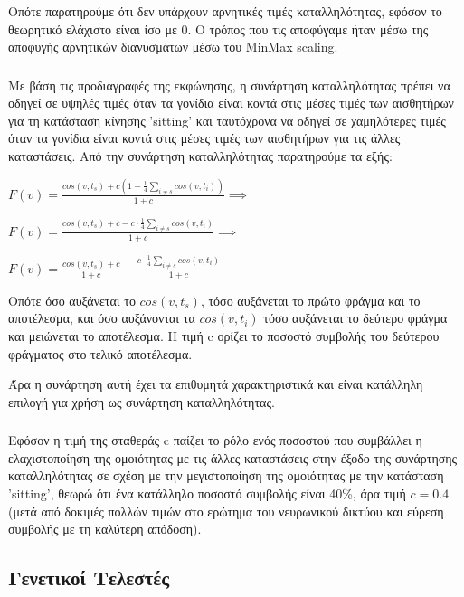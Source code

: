 \documentclass[12pt,a4paper]{article}
\begin{document}
Οπότε παρατηρούμε ότι δεν υπάρχουν αρνητικές τιμές καταλληλότητας, εφόσον το θεωρητικό ελάχιστο είναι ίσο με 0. Ο τρόπος που τις αποφύγαμε ήταν μέσω της αποφυγής αρνητικών διανυσμάτων μέσω του MinMax scaling.

\subsubsection{}

Με βάση τις προδιαγραφές της εκφώνησης, η συνάρτηση καταλληλότητας πρέπει να οδηγεί σε υψηλές τιμές όταν τα γονίδια είναι κοντά στις μέσες τιμές των αισθητήρων για τη κατάσταση κίνησης 'sitting' και ταυτόχρονα να οδηγεί σε χαμηλότερες τιμές όταν τα γονίδια είναι κοντά στις μέσες τιμές των αισθητήρων για τις άλλες καταστάσεις. Από την συνάρτηση καταλληλότητας παρατηρούμε τα εξής:

\begin{center}
    $F(v) = \frac{cos(v,t_s) + c(1-\frac{1}{4}\sum_{i\neq s}cos(v,t_i))}{1+c} \implies$

    $F(v) = \frac{cos(v,t_s) + c - c\cdot\frac{1}{4}\sum_{i\neq s}cos(v,t_i)}{1+c} \implies$

    $F(v) = \frac{cos(v,t_s) + c}{1+c} - \frac{c\cdot\frac{1}{4}\sum_{i\neq s}cos(v,t_i)}{1+c}$
\end{center}

Οπότε όσο αυξάνεται το $cos(v,t_s)$, τόσο αυξάνεται το πρώτο φράγμα και το αποτέλεσμα, και όσο αυξάνονται τα $cos(v,t_i)$ τόσο αυξάνεται το δεύτερο φράγμα και μειώνεται το αποτέλεσμα. Η τιμή c ορίζει το ποσοστό συμβολής του δεύτερου φράγματος στο τελικό αποτέλεσμα.

Άρα η συνάρτηση αυτή έχει τα επιθυμητά χαρακτηριστικά και είναι κατάλληλη επιλογή για χρήση ως συνάρτηση καταλληλότητας.

\subsubsection{}

Εφόσον η τιμή της σταθεράς c παίζει το ρόλο ενός ποσοστού που συμβάλλει η ελαχιστοποίηση της ομοιότητας με τις άλλες καταστάσεις στην έξοδο της συνάρτησης καταλληλότητας σε σχέση με την μεγιστοποίηση της ομοιότητας με την κατάσταση 'sitting', θεωρώ ότι ένα κατάλληλο ποσοστό συμβολής είναι 40\%, άρα τιμή $c = 0.4$ (μετά από δοκιμές πολλών τιμών στο ερώτημα του νευρωνικού δικτύου και εύρεση συμβολής με τη καλύτερη απόδοση).

\subsection{Γενετικοί Τελεστές}
\end{document}
